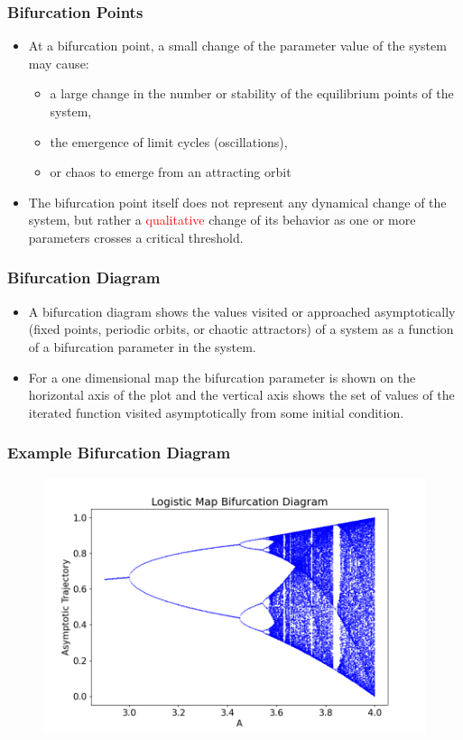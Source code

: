 \documentclass[
	11pt, %
	aspectratio=169, %
]{beamer}
\begin{document}

\begin{frame}
	\frametitle{Bifurcation Points}
    \begin{itemize}
        \item At a bifurcation point, a small change of the parameter value of the system may cause:
        \begin{itemize}
            \item a large change in the number or stability of the equilibrium points of the system,
            \item the emergence of limit cycles (oscillations),
            \item or chaos to emerge from an attracting orbit
        \end{itemize} \pause
        \item The bifurcation point itself does not represent any dynamical change of the system, but rather a \textcolor{red}{qualitative} change of its behavior as one or more parameters crosses a critical threshold.
    \end{itemize}
\end{frame}


\begin{frame}
	\frametitle{Bifurcation Diagram}
    \begin{itemize}
        \item A bifurcation diagram shows the values visited or approached asymptotically (fixed points, periodic orbits, or chaotic attractors) of a system as a function of a bifurcation parameter in the system. \pause
        \item For a one dimensional map the bifurcation parameter is shown on the horizontal axis of the plot and the vertical axis shows the set of values of the iterated function visited asymptotically from some initial condition.
    \end{itemize}
\end{frame}


\begin{frame}
	\frametitle{Example Bifurcation Diagram}
    \begin{figure}
        \includegraphics[width=0.7\linewidth]{logistic_bifurcation_diagram.png}
    \end{figure}
\end{frame}
\end{document}
